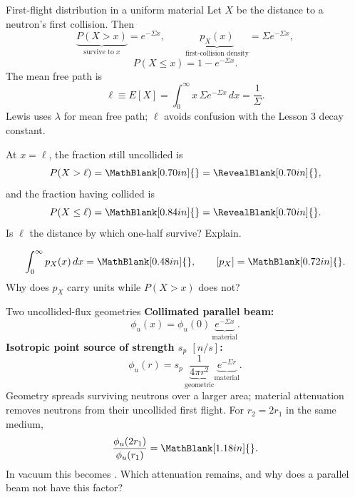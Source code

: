\newpage
\begin{handoutcolumns}


\begin{fixedbox}{First-flight distribution in a uniform material}
\footnotesize
Let $X$ be the distance to a neutron's first collision. Then
\[
 \underbrace{P(X>x)}_{\text{survive to }x}=e^{-\Sigma x},
 \qquad
 \underbrace{p_X(x)}_{\text{first-collision density}}
 =\Sigma e^{-\Sigma x},
\]
\[
 P(X\le x)=1-e^{-\Sigma x}.
\]
The mean free path is
\[
 \boxed{\ell\equiv E[X]
 =\int_0^\infty x\,\Sigma e^{-\Sigma x}\,dx
 =\frac{1}{\Sigma}}.
\]
Lewis uses $\lambda$ for mean free path; $\ell$ avoids confusion with the
Lesson 3 decay constant.
\normalsize
\end{fixedbox}

\begin{checkpoint}
At $x=\ell$, the fraction still uncollided is
\[
 P(X>\ell)=\MathBlank[0.70in]{}=
 \RevealBlank[0.70in]{},
\]
and the fraction having collided is
\[
 P(X\le\ell)=\MathBlank[0.84in]{}=
 \RevealBlank[0.70in]{}.
\]
Is $\ell$ the distance by which one-half survive? Explain.
\end{checkpoint}

\begin{checkpoint}
\[
 \int_0^\infty p_X(x)\,dx=\MathBlank[0.48in]{},
 \qquad [p_X]=\MathBlank[0.72in]{}.
\]
Why does $p_X$ carry units while $P(X>x)$ does not?
\end{checkpoint}


\begin{fixedbox}{Two uncollided-flux geometries}
\footnotesize
\textbf{Collimated parallel beam:}
\[
 \phi_u(x)=\phi_u(0)\,\underbrace{e^{-\Sigma x}}_{\text{material}}.
\]
\textbf{Isotropic point source of strength $s_p$ $[\unit{n/s}]$:}
\[
 \phi_u(r)=s_p\,
 \underbrace{\frac{1}{4\pi r^2}}_{\text{geometric}}
 \underbrace{e^{-\Sigma r}}_{\text{material}}.
\]
Geometry spreads surviving neutrons over a larger area; material attenuation
removes neutrons from their uncollided first flight.
For $r_2=2r_1$ in the same medium,
\[
 \frac{\phi_u(2r_1)}{\phi_u(r_1)}
 =\MathBlank[1.18in]{}.
\]
In vacuum this becomes \RevealBlank[0.48in]{}. Which attenuation remains,
and why does a parallel beam not have this factor?
\normalsize
\end{fixedbox}


\end{handoutcolumns}
